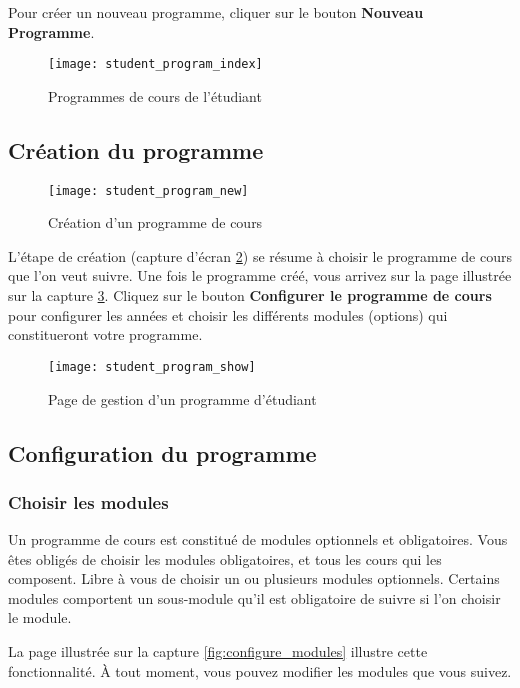 Pour créer un nouveau programme, cliquer sur le bouton \textbf{Nouveau Programme}.


\begin{figure}[htb]
\centering
\caption{Programmes de cours de l'étudiant}
\label{fig:student_program_index}
\texttt{[image: student\_program\_index]}
\end{figure}

\subsection{Création du programme}

\begin{figure}[htb]
\centering
\caption{Création d'un programme de cours}
\label{fig:student_program_new}
\texttt{[image: student\_program\_new]}
\end{figure}

L'étape de création (capture d'écran \ref{fig:student_program_new}) se résume à choisir le programme de cours que l'on veut suivre. Une fois le programme créé, vous arrivez sur la page illustrée sur la capture \ref{fig:student_program_mgmt}. Cliquez sur le bouton \textbf{Configurer le programme de cours} pour configurer les années et choisir les différents modules (options) qui constitueront votre programme.

\begin{figure}[htb]
\centering
\caption{Page de gestion d'un programme d'étudiant}
\label{fig:student_program_mgmt}
\texttt{[image: student\_program\_show]}
\end{figure}

\subsection{Configuration du programme}
\subsubsection{Choisir les modules}
Un programme de cours est constitué de modules optionnels et obligatoires. Vous êtes obligés de choisir les modules obligatoires, et tous les cours qui les composent. Libre à vous de choisir un ou plusieurs modules optionnels. Certains modules comportent un sous-module qu'il est obligatoire de suivre si l'on choisir le module.

La page illustrée sur la capture \ref{fig:configure_modules} illustre cette fonctionnalité. À tout moment, vous pouvez modifier les modules que vous suivez. 

